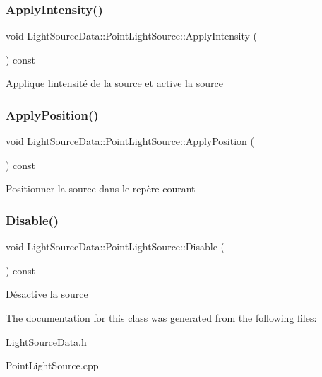 \subsubsection{\texorpdfstring{ApplyIntensity()}{ApplyIntensity()}}
{\footnotesize\ttfamily void Light\+Source\+Data\+::\+Point\+Light\+Source\+::\+Apply\+Intensity (\begin{DoxyParamCaption}{ }\end{DoxyParamCaption}) const}

Applique l\textquotesingle{}intensité de la source et active la source \mbox{\label{classLightSourceData_1_1PointLightSource_a68330385482fc307c08f9ceab24eea90}} 
\subsubsection{\texorpdfstring{ApplyPosition()}{ApplyPosition()}}
{\footnotesize\ttfamily void Light\+Source\+Data\+::\+Point\+Light\+Source\+::\+Apply\+Position (\begin{DoxyParamCaption}{ }\end{DoxyParamCaption}) const}

Positionner la source dans le repère courant \mbox{\label{classLightSourceData_1_1PointLightSource_ac350b9eb76b71d6498c12ba3bbb73981}} 
\subsubsection{\texorpdfstring{Disable()}{Disable()}}
{\footnotesize\ttfamily void Light\+Source\+Data\+::\+Point\+Light\+Source\+::\+Disable (\begin{DoxyParamCaption}{ }\end{DoxyParamCaption}) const}

Désactive la source 

The documentation for this class was generated from the following files\+:\begin{DoxyCompactItemize}
\item 
Light\+Source\+Data.\+h\item 
Point\+Light\+Source.\+cpp\end{DoxyCompactItemize}
